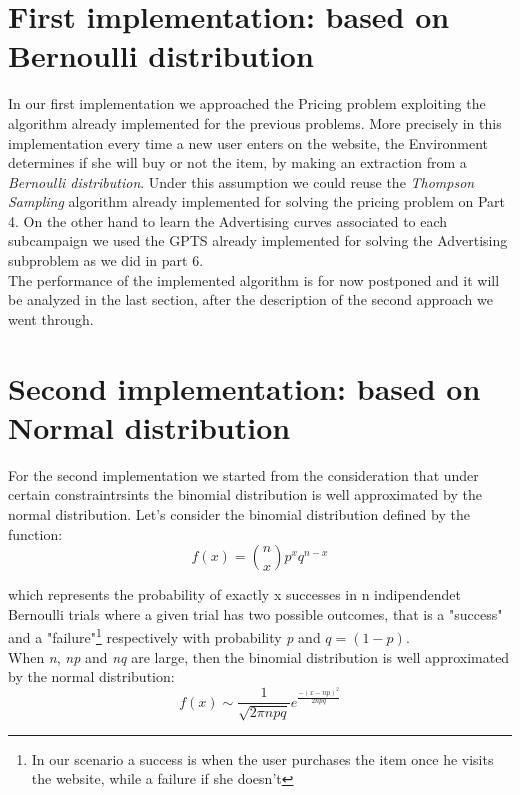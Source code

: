 \section{First implementation: based on Bernoulli distribution}
In our first implementation we approached the Pricing problem exploiting the algorithm already implemented for the previous problems. More precisely in this implementation every time a new user enters on the website, the Environment determines if she will buy or not the item, by making an extraction from a \textit{Bernoulli distribution}. Under this assumption we could reuse the \textit{Thompson Sampling} algorithm already implemented for solving the pricing problem on Part 4.
On the other hand to learn the Advertising curves associated to each subcampaign we used the GPTS already implemented for solving the Advertising subproblem as we did in part 6.\\ The performance of the implemented algorithm is for now postponed and it will be analyzed in the last section, after the description of the second approach we went through.


\section{Second implementation: based on Normal distribution}
For the second implementation we started from the consideration that under certain constraintrsints the binomial distribution is well approximated by the normal distribution. Let's consider the binomial distribution defined by the function:
\begin{equation}
    f(x) = \binom{n}{x}  p^x q^{n-x} 
\end{equation}

which represents the probability of exactly x successes in n indipendendet Bernoulli trials where a given trial has two possible outcomes, that is a "success" and a "failure"\footnote{In our scenario a success is when the user purchases the item once he visits the website, while a failure if she doesn't} respectively with probability \textit{p} and $q=(1-p)$.\\ When \textit{n}, \textit{np} and \textit{nq} are large, then the binomial distribution is well approximated by the normal distribution:
\begin{equation}
    f(x)  \sim \frac{1}{\sqrt{2 \pi npq}} e^{ \frac{-(x-np)^2}{2npq} }
\end{equation}


